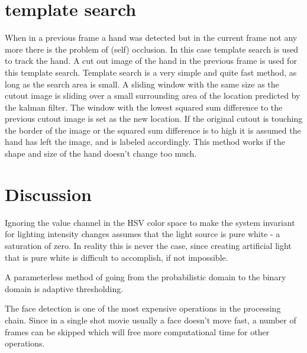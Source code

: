 \section{template search}
When in a previous frame a hand was detected but in the current frame not any more there is the problem of (self) occlusion. In this case template search is used to track the hand. A cut out image of the hand in the previous frame is used for this template search. Template search is a very simple and quite fast method, as long as the search area is small. A sliding window  with the same size as the cutout image is sliding over a small surrounding area of the location predicted by the kalman filter. The window with the lowest squared sum difference to the previous cutout image is set as the new location. If the original cutout is touching the border of the image or the squared sum difference is to high it is assumed the hand has left the image, and is labeled accordingly. This method works if the shape and size of the hand doesn't change too much.

\section{Discussion}
Ignoring the value channel in the HSV color space to make the system invariant for lighting intensity changes assumes that the light source is pure white - a saturation of zero. In reality this is never the case, since creating artificial light that is pure white is difficult to accomplish, if not impossible.

A parameterless method of going from the probabilistic domain to the binary domain is adaptive thresholding.

The face detection is one of the most expensive operations in the processing chain. Since in a single shot movie usually a face doesn't move fast, a number of frames can be skipped which will free more computational time for other operations.


